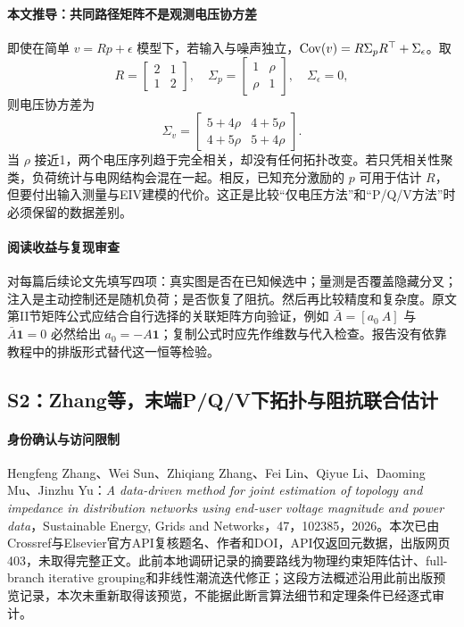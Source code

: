 \paragraph{本文推导：共同路径矩阵不是观测电压协方差}
即使在简单 $v=Rp+\epsilon$ 模型下，若输入与噪声独立，$\operatorname{Cov}(v)=R\Sigma_pR^\top+\Sigma_\epsilon$。取
\begin{equation}
 R=\begin{bmatrix}2&1\\1&2\end{bmatrix},\quad
 \Sigma_p=\begin{bmatrix}1&\rho\\\rho&1\end{bmatrix},\quad\Sigma_\epsilon=0,
\end{equation}
则电压协方差为
\begin{equation}
 \Sigma_v=\begin{bmatrix}5+4\rho&4+5\rho\\4+5\rho&5+4\rho\end{bmatrix}.
\end{equation}
当 $\rho$ 接近1，两个电压序列趋于完全相关，却没有任何拓扑改变。若只凭相关性聚类，负荷统计与电网结构会混在一起。相反，已知充分激励的 $p$ 可用于估计 $R$，但要付出输入测量与EIV建模的代价。这正是比较“仅电压方法”和“P/Q/V方法”时必须保留的数据差别。

\paragraph{阅读收益与复现审查}
对每篇后续论文先填写四项：真实图是否在已知候选中；量测是否覆盖隐藏分叉；注入是主动控制还是随机负荷；是否恢复了阻抗。然后再比较精度和复杂度。原文第II节矩阵公式应结合自行选择的关联矩阵方向验证，例如 $\bar A=[a_0\ A]$ 与 $\bar A\mathbf1=0$ 必然给出 $a_0=-A\mathbf1$；复制公式时应先作维数与代入检查。报告没有依靠教程中的排版形式替代这一恒等检验。

\subsection{S2：Zhang等，末端P/Q/V下拓扑与阻抗联合估计}
\paragraph{身份确认与访问限制}
Hengfeng Zhang、Wei Sun、Zhiqiang Zhang、Fei Lin、Qiyue Li、Daoming Mu、Jinzhu Yu：\emph{A data-driven method for joint estimation of topology and impedance in distribution networks using end-user voltage magnitude and power data}，Sustainable Energy, Grids and Networks，47，102385，2026\citep{S2}。本次已由Crossref与Elsevier官方API复核题名、作者和DOI，API仅返回元数据，出版网页403，未取得完整正文。此前本地调研记录的摘要路线为物理约束矩阵估计、full-branch iterative grouping和非线性潮流迭代修正；这段方法概述沿用此前出版预览记录，本次未重新取得该预览，不能据此断言算法细节和定理条件已经逐式审计。

